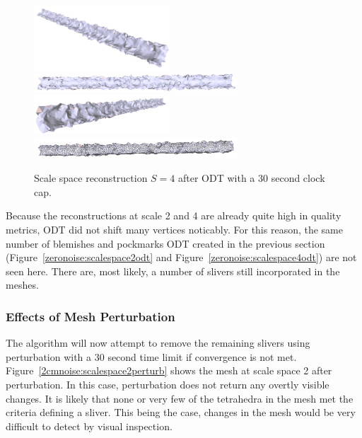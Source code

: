 \documentclass[12pt]{drexelthesis}
\let\Oldsubsubsection\subsubsection
\renewcommand{\subsubsection}{\FloatBarrier\Oldsubsubsection}
\begin{document}
\begin{figure}[!ht]
	\centering
		\includegraphics[width=2in]{simulated-lab-scan/2cmnoise/optimized/scalespace4odt00.png}
		\includegraphics[width=3in]{simulated-lab-scan/2cmnoise/optimized/scalespace4odt01.png}
		\includegraphics[width=2in]{simulated-lab-scan/2cmnoise/optimized/scalespace4odt02.png}
		\includegraphics[width=3in]{simulated-lab-scan/2cmnoise/optimized/scalespace4odt03.png}
		\caption[Scale space reconstruction $S = 4$ after ODT with a 30 second clock cap]{\centering Scale space reconstruction $S = 4$ after ODT with a 30 second clock cap.}
	\label{2cmnoise:scalespace4odt}
\end{figure}

Because the reconstructions at scale 2 and 4 are already quite high in quality metrics, ODT did not shift many vertices noticably. For this reason, the same number of blemishes and pockmarks ODT created in the previous section (Figure~\ref{zeronoise:scalespace2odt} and Figure~\ref{zeronoise:scalespace4odt}) are not seen here. There are, most likely, a number of slivers still incorporated in the meshes.

\subsubsection{Effects of Mesh Perturbation}

The algorithm will now attempt to remove the remaining slivers using perturbation with a 30 second time limit if convergence is not met. Figure~\ref{2cmnoise:scalespace2perturb} shows the mesh at scale space 2 after perturbation. In this case, perturbation does not return any overtly visible changes. It is likely that none or very few of the tetrahedra in the mesh met the criteria defining a sliver. This being the case, changes in the mesh would be very difficult to detect by visual inspection.
\end{document}
